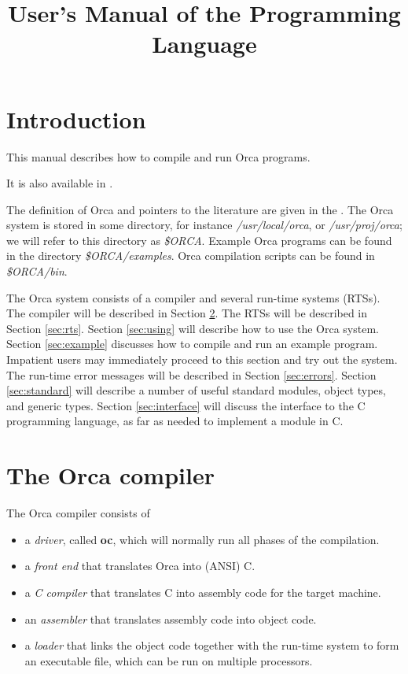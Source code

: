 \documentclass[10pt]{article}
\begin{document}
\title{User's Manual of the Programming Language
{}
{}}

\maketitle

\section{Introduction}

This manual describes how to compile and run Orca programs.
\begin{htmlonly}
It is also available in
.
\end{htmlonly}
The definition of Orca and pointers to the literature are given in
the {}{}.
The Orca system is stored in some directory,
for instance
{\em /usr/local/orca},
or
{\em /usr/proj/orca};
we will refer to this directory as
{\em \$ORCA}.
Example Orca programs can be found in the directory
{\em \$ORCA/examples}.
Orca compilation scripts can be found in {\em \$ORCA/bin}.

The Orca system consists of a compiler and several run-time systems (RTSs).
The compiler will be described in Section \ref{sec:compiler}.
The RTSs will be described in Section \ref{sec:rts}.
Section \ref{sec:using} will describe how to use the Orca system.
Section \ref{sec:example} discusses how to compile and run an example program.
Impatient users may immediately proceed to this section and try out the system.
The run-time error messages will be described in Section \ref{sec:errors}.
Section \ref{sec:standard}
will describe a number of useful standard modules, object types, and
generic types. Section \ref{sec:interface} will discuss the interface to the C programming
language, as far as needed to implement a module in C.

\section{The Orca compiler}\label{sec:compiler}

The Orca compiler consists of

\begin{itemize}
\item
a {\em driver}, called {\bf oc},
which will normally run all phases
of the compilation.
\item
a {\em front end} that translates Orca into (ANSI) C.
\item
a {\em C compiler} that translates C into assembly code for the
target machine.
\item
an {\em assembler} that translates assembly code into object code.
\item
a {\em loader} that links the object code together with the run-time system
to form an executable file, which can be run on multiple processors.
\end{itemize}
\end{document}
